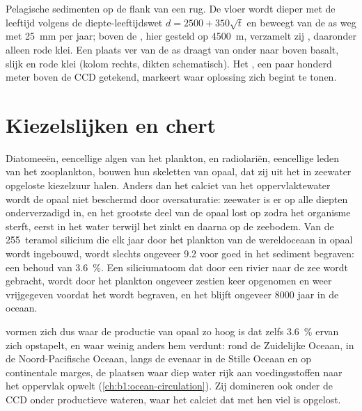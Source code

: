 \begin{omfigure}
{\small Pelagische sedimenten op de flank van een rug. De vloer wordt dieper met de leeftijd volgens de diepte-leeftijdswet $d = 2500 + 350\sqrt t$ en beweegt van de as weg met \qty{25}{mm} per jaar; boven de , hier gesteld op \qty{4500}{m}, verzamelt zij , daaronder alleen rode klei. Een plaats ver van de as draagt van onder naar boven basalt, slijk en rode klei (kolom rechts, dikten schematisch). Het , een paar honderd meter boven de CCD getekend, markeert waar oplossing zich begint te tonen.}
\label{fig:b1:chemical-biogenic-sediments:flank}
\end{omfigure}

\section{Kiezelslijken en chert}\label{sec:b1:chemical-biogenic-sediments:silica}

Diatomeeën, eencellige algen van het plankton, en radiolariën, eencellige leden van het zooplankton, bouwen hun skeletten van opaal, dat zij uit het in zeewater opgeloste kiezelzuur halen. Anders dan het calciet van het oppervlaktewater wordt de opaal niet beschermd door oversaturatie: zeewater is er op alle diepten onderverzadigd in, en het grootste deel van de opaal lost op zodra het organisme sterft, eerst in het water terwijl het zinkt en daarna op de zeebodem. Van de 255~teramol silicium die elk jaar door het plankton van de wereldoceaan in opaal wordt ingebouwd, wordt slechts ongeveer 9.2 voor goed in het sediment begraven: een behoud van \qty{3.6}{\%}. Een siliciumatoom dat door een rivier naar de zee wordt gebracht, wordt door het plankton ongeveer zestien keer opgenomen en weer vrijgegeven voordat het wordt begraven, en het blijft ongeveer \num{8000} jaar in de oceaan.

 vormen zich dus waar de productie van opaal zo hoog is dat zelfs \qty{3.6}{\%} ervan zich opstapelt, en waar weinig anders hem verdunt: rond de Zuidelijke Oceaan, in de Noord-Pacifische Oceaan, langs de evenaar in de Stille Oceaan en op continentale marges, de plaatsen waar diep water rijk aan voedingsstoffen naar het oppervlak opwelt (\cref{ch:b1:ocean-circulation}). Zij domineren ook onder de CCD onder productieve wateren, waar het calciet dat met hen viel is opgelost.

